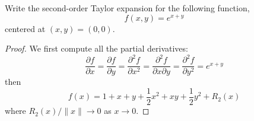 \documentclass[openany]{book}
\begin{document}
\begin{prob}
    Write the second-order Taylor expansion for the following function, 
    \begin{equation*}
        f(x,y)=e^{x+y}
    \end{equation*}
    centered at $(x,y)=(0,0)$.
\end{prob}
\begin{proof}
    We first compute all the partial derivatives:
    \begin{equation*}
        \frac{\partial f}{\partial x}=\frac{\partial f}{\partial y}=\frac{\partial^2f}{\partial x^2}=\frac{\partial^2f}{\partial x\partial y}=\frac{\partial^2f}{\partial y^2}=e^{x+y}
    \end{equation*}
    then 
    \begin{equation*}
        f(x)=1+x+y+\frac{1}{2}x^2+xy+\frac{1}{2}y^2+R_2(x)
    \end{equation*}
    where $R_2(x)/\|x\|\to 0$ as $x\to 0$.
\end{proof}
\end{document}
